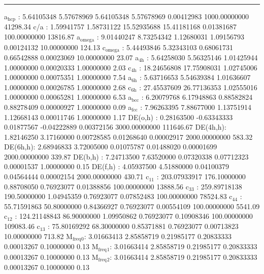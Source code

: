 \documentclass[11pt]{article}
\begin{document}
\noindent\rule{\textwidth}{0.5pt}
a\(_{\text{hcp}}\)   :   5.64105348   5.57678969   5.64105348   5.57678969   0.00412983 1000.00000000     41298.34
c/a     :   1.59941757   1.58731122  15.52935688  15.41181168   0.01381687 100.00000000     13816.87
a\(_{\text{omega}}\) :   9.01440247   8.73254342   1.12680031   1.09156793   0.00124132  10.00000000       124.13
c\(_{\text{omega}}\) :   5.44493846   5.32343103   0.68061731   0.66542888   0.00023069  10.00000000        23.07
a\(_{\text{4h}}\)    :   5.64258030   5.56325146   1.01425944   1.00000000   0.00020333   1.00000000         2.03
c\(_{\text{4h}}\)    :  18.24656808  17.75908031   1.02745006   1.00000000   0.00075351   1.00000000         7.54
a\(_{\text{6h}}\)    :   5.63716653   5.54639384   1.01636607   1.00000000   0.00026785   1.00000000         2.68
c\(_{\text{6h}}\)    :  27.45537609  26.77136353   1.02555016   1.00000000   0.00065281   1.00000000         6.53
a\(_{\text{bcc}}\)   :   6.20079768   6.17948863   0.88582824   0.88278409   0.00000927   1.00000000         0.09
a\(_{\text{fcc}}\)   :   7.96263395   7.88677000   1.13751914   1.12668143   0.00011746   1.00000000         1.17
DE(o,h) :   0.28163500  -0.63343333   0.01877567  -0.04222889   0.00372156 3000.00000000    111646.67
DE(4h,h):   1.82146250   3.17160000   0.00728585   0.01268640   0.00002917 2000.00000000       583.32
DE(6h,h):   2.68946833   3.72005000   0.01075787   0.01488020   0.00001699 2000.00000000       339.87
DE(b,h) :   7.24713500   7.63520000   0.07320338   0.07712323   0.00001537   1.00000000         0.15
DE(f,h) :   4.05937500   4.51880000   0.04100379   0.04564444   0.00002154 2000.00000000       430.71
c\(_{\text{11}}\)    : 203.07933917 176.10000000   0.88708050   0.76923077   0.01388856 100.00000000     13888.56
c\(_{\text{33}}\)    : 259.89718138 190.50000000   1.04945359   0.76923077   0.07852483 100.00000000     78524.83
c\(_{\text{44}}\)    :  55.71591863  50.80000000   0.84366927   0.76923077   0.00554109 100.00000000      5541.09
c\(_{\text{12}}\)    : 124.21148843  86.90000000   1.09950862   0.76923077   0.10908346 100.00000000    109083.46
c\(_{\text{13}}\)    :  75.80169292  68.30000000   0.85371881   0.76923077   0.00713823  10.00000000       713.82
M\(_{\text{freq}}\)\(_{\text{0}}\):   3.01663413   2.85858719   0.21985177   0.20833333   0.00013267   0.10000000         0.13
M\(_{\text{freq}}\)\(_{\text{1}}\):   3.01663414   2.85858719   0.21985177   0.20833333   0.00013267   0.10000000         0.13
M\(_{\text{freq}}\)\(_{\text{2}}\):   3.01663414   2.85858719   0.21985177   0.20833333   0.00013267   0.10000000         0.13
\end{document}
